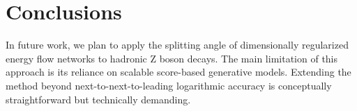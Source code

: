 \section{Conclusions}\label{sec:conclusions}

In future work, we plan to apply the splitting angle of dimensionally
regularized energy flow networks to hadronic Z boson decays. The main
limitation of this approach is its reliance on scalable score-based
generative models. Extending the method beyond next-to-next-to-leading
logarithmic accuracy is conceptually straightforward but technically
demanding.


